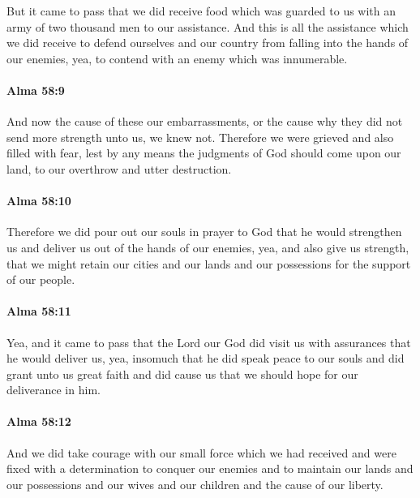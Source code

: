 			But it came to pass that we did receive food
			which was guarded to us with an army of two thousand men to our assistance.
			And this is all the assistance which we did receive
			to defend ourselves and our country
			from falling into the hands of our enemies,
			yea, to contend with an enemy which was innumerable.

		\paragraph{Alma 58:9} %
			\label{ALMA-58-9}

			And now the cause of these our embarrassments,
			or the cause why they did not send more strength unto us, we knew not.
			Therefore we were grieved and also filled with fear,
			lest by any means the judgments of God should come upon our land,
			to our overthrow and utter destruction.

		\paragraph{Alma 58:10} %
			\label{ALMA-58-10}

			Therefore we did pour out our souls in prayer to God
			that he would strengthen us and deliver us out of the hands of our enemies,
			yea, and also give us strength,
			that we might retain our cities and our lands and our possessions
			for the support of our people.

		\paragraph{Alma 58:11} %
			\label{ALMA-58-11}

			Yea, and it came to pass that
			the Lord our God did visit us with assurances
			that he would deliver us,
			yea, insomuch that he did speak peace to our souls
			and did grant unto us great faith
			and did cause us that we should hope for our deliverance in him.

		\paragraph{Alma 58:12} %
			\label{ALMA-58-12}

			And we did take courage with our small force which we had received
			and were fixed with a determination to conquer our enemies
			and to maintain our lands and our possessions
			and our wives and our children and the cause of our liberty.

